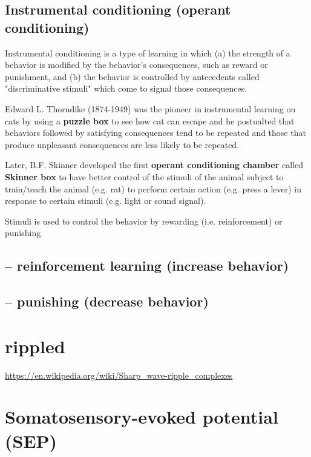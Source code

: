 \subsection{Instrumental conditioning (operant conditioning)}
\label{sec:operant-conditioning}

Instrumental conditioning is a type of learning in which (a) the strength of a
behavior is modified by the behavior's consequences, such as reward or
punishment, and (b) the behavior is controlled by antecedents called
"discriminative stimuli" which come to signal those consequences.

Edward L. Thorndike (1874-1949) was the pioneer in instrumental learning on cats
by using a {\bf puzzle box} to see how cat can escape and he postualted that
behaviors followed by satisfying consequences tend to be repeated and those that
produce unpleasant consequences are less likely to be repeated.

Later, B.F. Skinner developed the first {\bf operant conditioning chamber}
called {\bf Skinner box} to have better control of the stimuli of the animal
subject to train/teach the animal (e.g. rat) to perform certain action (e.g.
press a lever) in response to certain stimuli (e.g. light or sound signal).

Stimuli is used to control the behavior by rewarding (i.e. reinforcement) or
punishing



\subsection{-- reinforcement learning (increase behavior)}
\label{sec:reinforcement-learning}



\subsection{-- punishing (decrease behavior)}



\section{rippled}
\label{sec:ripple}

\url{https://en.wikipedia.org/wiki/Sharp_wave-ripple_complexes}

\section{Somatosensory-evoked potential (SEP)}
\label{sec:sensory-evoked-potential}
\label{sec:somatosensory-evoked-potential}

